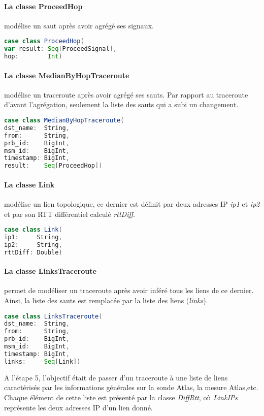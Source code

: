 \paragraph{La classe ProceedHop } modélise un saut après avoir agrégé ses signaux. 
\begin{lstlisting}[language=scala]
case class ProceedHop(
var result: Seq[ProceedSignal],
hop:        Int)
\end{lstlisting}


\paragraph{La classe MedianByHopTraceroute } modélise un traceroute après avoir agrégé ses sauts. Par rapport au traceroute d'avant l'agrégation, seulement la liste des sauts qui a subi un changement. 
\begin{lstlisting}[language=scala]
case class MedianByHopTraceroute(
dst_name:  String,
from:      String,
prb_id:    BigInt,
msm_id:    BigInt,
timestamp: BigInt,
result:    Seq[ProceedHop])
\end{lstlisting}


\paragraph{La classe Link} modélise un lien topologique, ce dernier est définit par deux adresses IP  \textit{ip1} et \textit{ip2} et par son RTT différentiel calculé \textit{rttDiff}.
\begin{lstlisting}[language=scala]
case class Link(
ip1:     String,
ip2:     String,
rttDiff: Double)
\end{lstlisting}

\paragraph{La classe LinksTraceroute} permet de modéliser un traceroute après avoir inféré tous les liens de ce dernier. Ainsi, la liste des sauts est remplacée par la liste des liens (\textit{links}). 

\begin{lstlisting}[language=scala]
case class LinksTraceroute(
dst_name:  String,
from:      String,
prb_id:    BigInt,
msm_id:    BigInt,
timestamp: BigInt,
links:     Seq[Link])
\end{lstlisting}


A l'étape 5, l'objectif était de passer d'un traceroute à une liste de liens caractérisés par les informations générales sur la sonde Atlas, la mesure Atlas,etc. Chaque élément de cette liste est présenté par la classe \textit{DiffRtt}, où \textit{LinkIPs} représente les deux adresses IP d'un lien donné.
